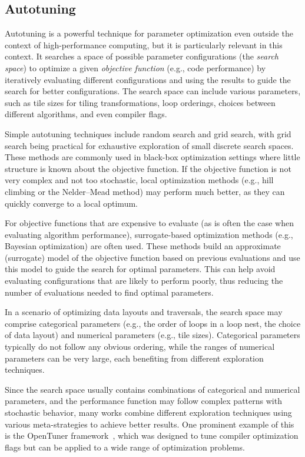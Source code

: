 \subsection{Autotuning}\label{sec:autotuning}

Autotuning is a powerful technique for parameter optimization even outside the context of high-performance computing, but it is particularly relevant in this context. It searches a space of possible parameter configurations (the \emph{search space}) to optimize a given \emph{objective function} (e.g., code performance) by iteratively evaluating different configurations and using the results to guide the search for better configurations. The search space can include various parameters, such as tile sizes for tiling transformations, loop orderings, choices between different algorithms, and even compiler flags.

Simple autotuning techniques include random search and grid search, with grid search being practical for exhaustive exploration of small discrete search spaces. These methods are commonly used in black-box optimization settings where little structure is known about the objective function. If the objective function is not very complex and not too stochastic, local optimization methods (e.g., hill climbing or the Nelder--Mead method) may perform much better, as they can quickly converge to a local optimum.

For objective functions that are expensive to evaluate (as is often the case when evaluating algorithm performance), surrogate-based optimization methods (e.g., Bayesian optimization) are often used. These methods build an approximate (surrogate) model of the objective function based on previous evaluations and use this model to guide the search for optimal parameters.
This can help avoid evaluating configurations that are likely to perform poorly, thus reducing the number of evaluations needed to find optimal parameters.

In a scenario of optimizing data layouts and traversals, the search space may comprise categorical parameters (e.g., the order of loops in a loop nest, the choice of data layout) and numerical parameters (e.g., tile sizes). Categorical parameters typically do not follow any obvious ordering, while the ranges of numerical parameters can be very large, each benefiting from different exploration techniques.

Since the search space usually contains combinations of categorical and numerical parameters, and the performance function may follow complex patterns with stochastic behavior, many works combine different exploration techniques using various meta-strategies to achieve better results. One prominent example of this is the OpenTuner framework~\cite{ansel2014opentuner}, which was designed to tune compiler optimization flags but can be applied to a wide range of optimization problems.

